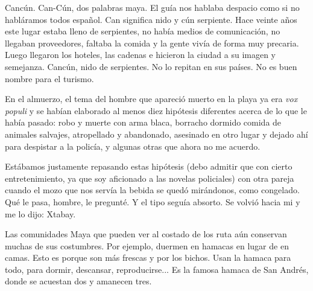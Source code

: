 \documentclass[11pt,twoside,openright,a6paper]{book}
\begin{document}
\vspace{0.5cm}
\hrulefill\hspace{0.2cm} \decofourleft\decofourright \hspace{0.2cm} \hrulefill
\vspace{0.5cm}

 Cancún. Can-Cún, dos palabras maya. El guía nos
hablaba despacio como si no habláramos todos español. Can significa nido
y cún serpiente. Hace veinte años este lugar estaba lleno de serpientes,
no había medios de comunicación, no llegaban proveedores, faltaba la
comida y la gente vivía de forma muy precaria. Luego llegaron los hoteles,
las cadenas e hicieron la ciudad a su imagen y semejanza. Cancún, nido de
serpientes. No lo repitan en sus países. No es buen nombre para el turismo.


\vspace{0.5cm}
\hrulefill\hspace{0.2cm} \decofourleft\decofourright \hspace{0.2cm} \hrulefill
\vspace{0.5cm}

En el almuerzo, el tema del hombre que apareció muerto en la playa ya era
\emph{vox populi} y se habían elaborado al menos diez hipótesis diferentes
acerca de lo que le había pasado: robo y muerte con arma blaca, borracho
dormido comida de animales salvajes, atropellado y abandonado, asesinado
en otro lugar y dejado ahí para despistar a la policía, y algunas otras
que ahora no me acuerdo.

Estábamos justamente repasando estas hipótesis (debo admitir que con cierto
entretenimiento, ya que soy aficionado a las novelas policiales) con otra
pareja cuando el mozo que nos servía la bebida se quedó mirándonos,
como congelado. Qué le pasa, hombre, le pregunté. Y el tipo seguía
absorto. Se volvió hacia mi y me lo dijo: Xtabay.


\vspace{0.5cm}
\hrulefill\hspace{0.2cm} \decofourleft\decofourright \hspace{0.2cm} \hrulefill
\vspace{0.5cm}

Las comunidades Maya que pueden ver al costado de los ruta aún conservan
muchas de sus costumbres. Por ejemplo, duermen en hamacas en lugar de en
camas. Esto es porque son más frescas y por los bichos. Usan la hamaca
para todo, para dormir, descansar, reproducirse... Es la famosa hamaca de
San Andrés, donde se acuestan dos y amanecen tres.
\end{document}
